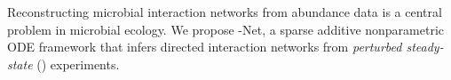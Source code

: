 Reconstructing microbial interaction networks from abundance data is a central
problem in microbial ecology. We propose \pss{}-Net, a sparse additive
nonparametric ODE framework that infers directed interaction networks from
\emph{perturbed steady-state} (\pss{}) experiments. %
